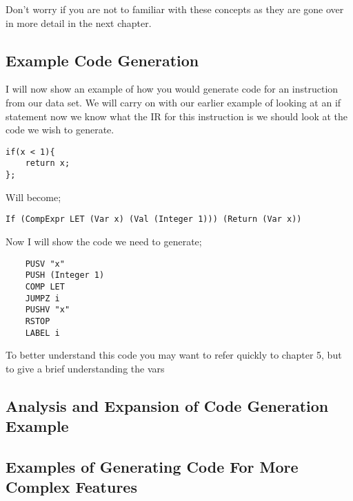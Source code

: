 Don't worry if you are not to familiar with these concepts as they are gone over in more detail in the next chapter.    

 
\subsection{Example Code Generation}

I will now show an example of how you would generate code for an instruction from our data set. We will carry on with our earlier example of looking at an if statement now we know what the IR for this instruction is we should look at the code we wish to generate. 

\begin{lstlisting}
if(x < 1){
	return x;
};
\end{lstlisting}
Will become;

\begin{lstlisting}
If (CompExpr LET (Var x) (Val (Integer 1))) (Return (Var x))
\end{lstlisting}
	
Now I will show the code we need to generate;

\begin{lstlisting}
	PUSV "x"         
	PUSH (Integer 1) 
	COMP LET         
	JUMPZ i           
	PUSHV "x"
	RSTOP           
	LABEL i
\end{lstlisting}

To better understand this code you may want to refer quickly to chapter 5, but to give a brief understanding the vars


\subsection{Analysis and Expansion of Code Generation Example}

\subsection{Examples of Generating Code For More Complex Features}
